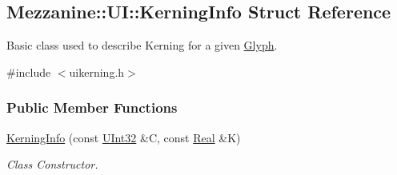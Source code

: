 \hypertarget{structMezzanine_1_1UI_1_1KerningInfo}{
\subsection{Mezzanine::UI::KerningInfo Struct Reference}
\label{structMezzanine_1_1UI_1_1KerningInfo}
}


Basic class used to describe Kerning for a given \hyperlink{classMezzanine_1_1UI_1_1Glyph}{Glyph}.  




{\ttfamily \#include $<$uikerning.h$>$}

\subsubsection*{Public Member Functions}
\begin{DoxyCompactItemize}
\item 
\hyperlink{structMezzanine_1_1UI_1_1KerningInfo_a6eef2c1d6c0cc22d89e4414faa6ad2a4}{KerningInfo} (const \hyperlink{namespaceMezzanine_abea3b8e8e9b03d2547b2800284ba682d}{UInt32} \&C, const \hyperlink{namespaceMezzanine_a726731b1a7df72bf3583e4a97282c6f6}{Real} \&K)
\begin{DoxyCompactList}\small\item\em Class Constructor. \item\end{DoxyCompactList}\end{DoxyCompactItemize}
